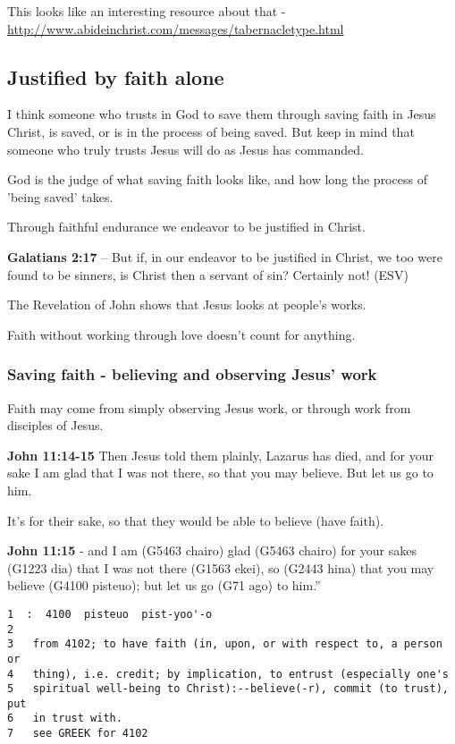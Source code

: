 \documentclass[11pt]{article}
\begin{document}
This looks like an interesting resource about that - \url{http://www.abideinchrist.com/messages/tabernacletype.html}

\subsection{Justified by faith alone}
\label{sec:org9ce231a}
I think someone who trusts in God to save them through saving faith in Jesus Christ, is saved, or is in the process of being saved.
But keep in mind that someone who truly trusts Jesus will do as Jesus has commanded.

God is the judge of what saving faith looks like, and how long the process of 'being saved' takes.

Through faithful endurance we endeavor to be justified in Christ.

\textbf{Galatians 2:17} -- But if, in our endeavor to be justified in Christ, we too were found to be sinners, is Christ then a servant of sin? Certainly not! (ESV)

The Revelation of John shows that Jesus looks at people's works.

Faith without working through love doesn't count for anything.

\subsubsection{Saving faith - believing and observing Jesus' work}
\label{sec:org6fab412}
Faith may come from simply observing Jesus work, or through work from
disciples of Jesus.

\textbf{John 11:14-15} Then Jesus told them plainly, Lazarus has died, and for your sake I am glad that I was not there, so that you may believe. But let us go to him.

It's for their sake, so that they would be able to believe (have faith).

\textbf{John 11:15} - and I am (G5463 chairo) glad (G5463 chairo) for your sakes (G1223 dia) that I was not there (G1563 ekei), so (G2443 hina) that you may believe (G4100 pisteuo); but let us go (G71 ago) to him.”

\begin{verbatim}
1  :  4100  pisteuo  pist-yoo'-o
2  
3   from 4102; to have faith (in, upon, or with respect to, a person or
4   thing), i.e. credit; by implication, to entrust (especially one's
5   spiritual well-being to Christ):--believe(-r), commit (to trust), put
6   in trust with.
7   see GREEK for 4102
\end{verbatim}
\end{document}
